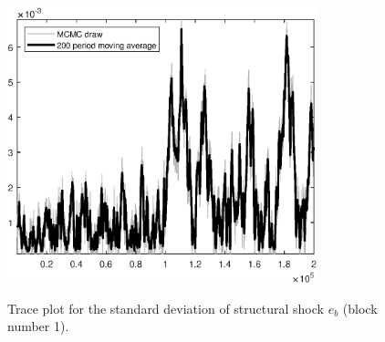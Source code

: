 \begin{figure}[H]
\centering
  \includegraphics[width=0.8\textwidth]{BRS_sectoral_rest/graphs/TracePlot_SE_e_b_blck_1}\\
    \caption{Trace plot for the standard deviation of structural shock ${e_b}$ (block number 1).}
\end{figure}
